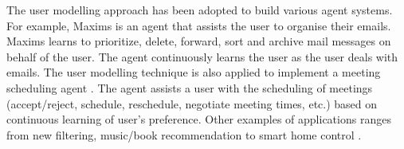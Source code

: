 The user modelling approach has been adopted to build various agent systems. For example, Maxims \citep{Metral1998} is an agent that assists the user to organise their emails. Maxims learns to prioritize, delete, forward, sort and archive mail messages on behalf of the user. The agent continuously learns the user as the user deals with emails. The user modelling technique is also applied to implement a meeting scheduling agent \citep{Kozierok1993}. The agent assists a user with the scheduling of meetings (accept/reject, schedule, reschedule, negotiate meeting times, etc.) based on continuous learning of user's preference. Other examples of applications ranges from new filtering, music/book recommendation \citep{Lieberman2003} to smart home control \citep{Costanza2014}.




